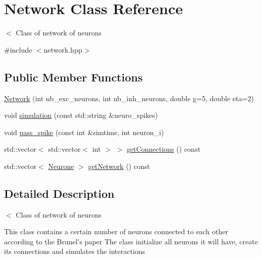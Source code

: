 \hypertarget{classNetwork}{\section{Network Class Reference}
\label{classNetwork}
}


$<$ Class of network of neurons  




{\ttfamily \#include $<$network.\-hpp$>$}

\subsection*{Public Member Functions}
\begin{DoxyCompactItemize}
\item 
\hyperlink{classNetwork_a8f3b1732014562eaeb408aa18fd1f85e}{Network} (int nb\-\_\-exc\-\_\-neurons, int nb\-\_\-inh\-\_\-neurons, double g=5, double eta=2)
\item 
void \hyperlink{classNetwork_a3cae76dd438d3116286ac03950e4e456}{simulation} (const std\-::string \&neuro\-\_\-spikes)
\item 
void \hyperlink{classNetwork_a438438cda176520bb01437e0fd12e266}{pass\-\_\-spike} (const int \&simtime, int neuron\-\_\-i)
\item 
std\-::vector$<$ std\-::vector$<$ int $>$ $>$ \hyperlink{classNetwork_af6bbff655263ceccaad427e91c269da3}{get\-Connections} () const 
\item 
std\-::vector$<$ \hyperlink{classNeurone}{Neurone} $>$ \hyperlink{classNetwork_a64758887eef67f258944f11770533b9d}{get\-Network} () const 
\end{DoxyCompactItemize}


\subsection{Detailed Description}
$<$ Class of network of neurons 

This class contains a certain number of neurons connected to each other according to the Brunel's paper The class initialize all neurons it will have, create its connections and simulates the interactions 

